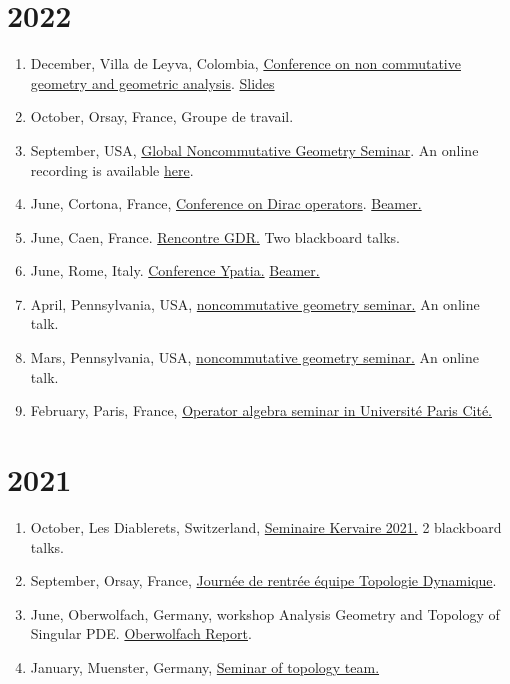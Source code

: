 \documentclass[a4paper, 13pt]{article}
\begin{document}
\section*{2022}
\begin{enumerate}
\item December, Villa de Leyva, Colombia, \href{https://villadeleyvaschool.uniandes.edu.co/}{Conference on non commutative geometry and geometric analysis}. \href{}{Slides} 
\item October, Orsay, France, Groupe de travail.
\item September, USA, \href{https://globalncgseminar.org/}{Global Noncommutative Geometry Seminar}. An online recording is available \href{https://www.youtube.com/watch?v=R2KYtnaNY1c}{here}. 
\item June, Cortona, France, \href{https://cortona2022.cbaer.eu}{Conference on Dirac operators}. \href{https://drive.google.com/file/d/17FAzqDf5xloyYLet5_Ee1kfEgcq8wg46/view?usp=sharing}{Beamer.}
\item June, Caen, France. \href{https://www.lmno.cnrs.fr/node/646}{Rencontre GDR.} Two blackboard talks.
\item June, Rome, Italy. \href{https://indico.math.cnrs.fr/event/5450/}{Conference Ypatia.} \href{https://drive.google.com/file/d/1GtBVvtIf_k2wj_zKyDyrV6XEwRzPmntD/view?usp=sharing}{Beamer.}
\item April, Pennsylvania, USA, \href{}{noncommutative geometry seminar.} An online talk.
\item Mars, Pennsylvania, USA, \href{}{noncommutative geometry seminar.} An online talk.
\item February, Paris, France, \href{https://www.imj-prg.fr/ao/seminaires/}{Operator algebra seminar in Université Paris Cité.}
\end{enumerate}
\section*{2021}
\begin{enumerate}
\item October, Les Diablerets, Switzerland, \href{https://www5.unine.ch/diablerets2021}{Seminaire Kervaire 2021.} 2 blackboard talks.
\item September, Orsay, France, \href{https://www.imo.universite-paris-saclay.fr/fr/events/6491}{Journée de rentrée équipe Topologie Dynamique}.
\item June, Oberwolfach, Germany, workshop Analysis Geometry and Topology of Singular PDE. \href{}{Oberwolfach Report}.
\item January, Muenster, Germany, \href{https://www.uni-muenster.de/Topologie/en/researchseminars/ostopows2021-v2.html}{Seminar of topology team.}
\end{enumerate}
\end{document}
